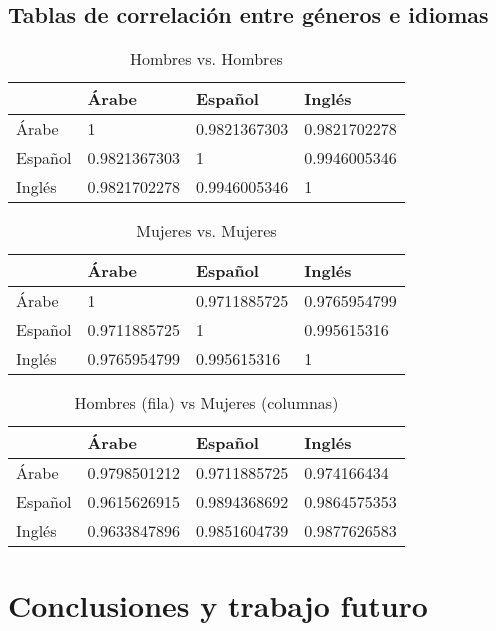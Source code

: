 \documentclass[runningheads]{llncs}
\begin{document}
\subsection{Tablas de correlación entre géneros e idiomas}
\begin{table}[]

\centering
\caption{Hombres vs. Hombres}
\label{male-vs-male-correlation}
\begin{tabular}{|l|l|l|l|}
\hline
        & Árabe        & Español      & Inglés       \\ \hline
Árabe   & 1            & 0.9821367303 & 0.9821702278 \\ \hline
Español & 0.9821367303 & 1            & 0.9946005346 \\ \hline
Inglés  & 0.9821702278 & 0.9946005346 & 1            \\ \hline
\end{tabular}
\end{table}

\begin{table}[]
\centering
\caption{Mujeres vs. Mujeres}
\label{female-vs-female-correlation}
\begin{tabular}{|l|l|l|l|}
\hline
        & Árabe        & Español      & Inglés       \\ \hline
Árabe   & 1            & 0.9711885725 & 0.9765954799 \\ \hline
Español & 0.9711885725 & 1            & 0.995615316  \\ \hline
Inglés  & 0.9765954799 & 0.995615316  & 1            \\ \hline
\end{tabular}
\end{table}


\begin{table}[]
\centering
\caption{Hombres (fila) vs Mujeres (columnas)}
\label{male-female-correlation}
\begin{tabular}{|l|l|l|l|}
\hline
        & Árabe        & Español      & Inglés       \\ \hline
Árabe   & 0.9798501212 & 0.9711885725 & 0.974166434  \\ \hline
Español & 0.9615626915 & 0.9894368692 & 0.9864575353 \\ \hline
Inglés  & 0.9633847896 & 0.9851604739 & 0.9877626583 \\ \hline
\end{tabular}
\end{table}

\section{Conclusiones y trabajo futuro}
\end{document}
